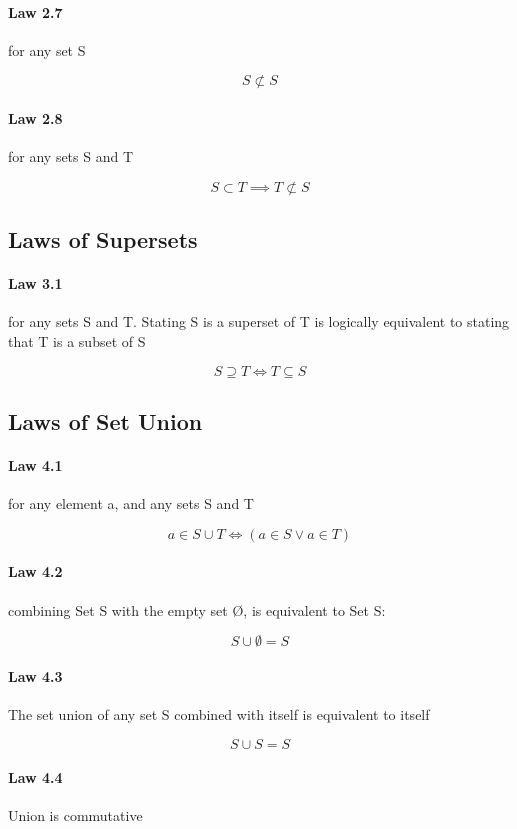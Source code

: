 \documentclass[twocolumn]{article}
\begin{document}
\paragraph{Law 2.7} for any set S

$$ S \not\subset S  $$

\paragraph{Law 2.8} for any sets S and T

$$ S \subset T \implies T\not\subset S $$

\subsection{Laws of Supersets}

\paragraph{Law 3.1} for any sets S and T. Stating S is a superset of T is logically equivalent to stating that T is a subset of S

$$ S  \supseteq  T \iff T  \subseteq  S $$

\subsection{Laws of Set Union}

\paragraph{Law 4.1} for any element a, and any sets S and T

$$ a  \in  S  \cup  T \iff (a  \in  S \vee a  \in  T) $$

\paragraph{Law 4.2} combining Set S with the empty set Ø, is equivalent to Set S:

$$ S \cup  \emptyset =S $$

\paragraph{Law 4.3} The set union of any set S combined with itself is equivalent to itself

$$ S  \cup  S=S $$

\paragraph{Law 4.4} Union is commutative
\end{document}
